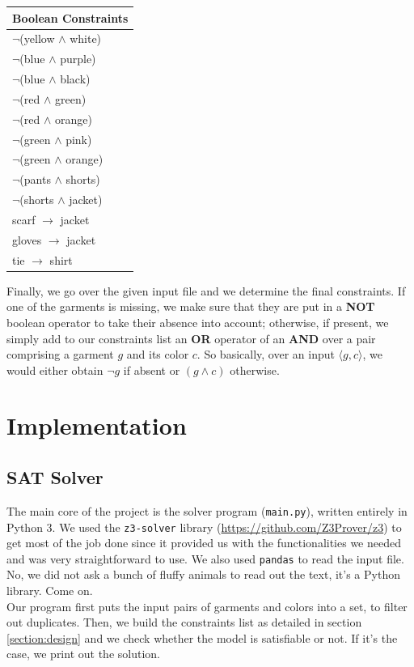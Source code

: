 \documentclass[12pt]{article}
\begin{document}
    \begin{center}
    \begin{tabular}{|l|}
    \hline
    Boolean Constraints \\
    \hline
    $\neg$(yellow $\wedge$ white) \\[0.1cm]
    $\neg$(blue $\wedge$ purple) \\[0.1cm]
    $\neg$(blue $\wedge$ black) \\[0.1cm]
    $\neg$(red $\wedge$ green) \\[0.1cm]
    $\neg$(red $\wedge$ orange) \\[0.1cm]
    $\neg$(green $\wedge$ pink) \\[0.1cm]
    $\neg$(green $\wedge$ orange) \\[0.1cm]
    $\neg$(pants $\wedge$ shorts) \\[0.1cm]
    $\neg$(shorts $\wedge$ jacket) \\[0.1cm]
    scarf $\rightarrow$ jacket \\[0.1cm]
    gloves $\rightarrow$ jacket \\[0.1cm]
    tie $\rightarrow$ shirt \\
    \hline
    \end{tabular}
    \end{center}

    Finally, we go over the given input file and we determine the final constraints. If one of the garments is missing, we make sure that they are put in a \textbf{NOT} boolean operator to take their absence into account; otherwise, if present, we simply add to our constraints list an \textbf{OR} operator of an \textbf{AND} over a pair comprising a garment $g$ and its color $c$. So basically, over an input $\langle g, c \rangle$, we would either obtain $\neg g$ if absent or $(g \wedge c)$ otherwise.


\section{Implementation}

    \subsection{SAT Solver}
        The main core of the project is the solver program (\texttt{main.py}), written entirely in Python 3. 
        We used the \texttt{z3-solver} library (\url{https://github.com/Z3Prover/z3}) to get most of the job done since it provided us with the functionalities
        we needed and was very straightforward to use. We also used \texttt{pandas} to read the input file. No, we did not ask a bunch of fluffy animals to read out the text, it's a Python library. Come on.\\
        Our program first puts the input pairs of garments and colors into a set, to filter out duplicates. Then, we build the constraints list as detailed in section \ref{section:design} and we check whether the model is
        satisfiable or not. If it's the case, we print out the solution.
\end{document}
